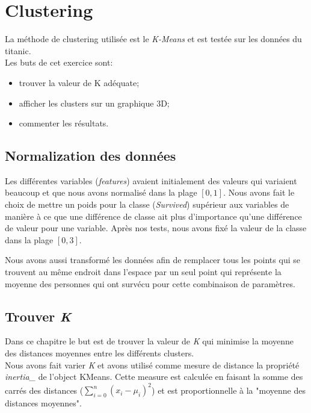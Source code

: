 \documentclass[11pt, a4paper]{article}
\begin{document}
\section{Clustering}

La méthode de clustering utilisée est le \textit{K-Means} et est testée sur les données du titanic. \\

Les buts de cet exercice sont:
\begin{itemize}
    \item trouver la valeur de K adéquate;
    \item afficher les clusters sur un graphique 3D;
    \item commenter les résultats. \\
\end{itemize}

\subsection{Normalization des données}

Les différentes variables (\textit{features}) avaient initialement des valeurs qui variaient
beaucoup et que nous avons normalisé dans la plage $[0, 1]$.
Nous avons fait le choix de mettre un poids pour la classe (\textit{Survived}) supérieur aux variables de manière à ce que
une différence de classe ait plus d'importance qu'une différence de valeur pour une variable.
Après nos tests, nous avons fixé la valeur de la classe dans la plage $[0, 3]$.

Nous avons aussi transformé les données afin de remplacer tous les points qui se trouvent au même endroit dans l'espace
par un seul point qui représente la moyenne des personnes qui ont survécu pour cette combinaison de paramètres.

\subsection{Trouver \textit{K}}

Dans ce chapitre le but est de trouver la valeur de \textit{K} qui minimise
la moyenne des distances moyennes entre les différents clusters. \\

Nous avons fait varier \textit{K} et avons utilisé comme mesure de distance la propriété \textit{inertia\_} de l'object KMeans.
Cette measure est calculée en faisant la somme des carrés des distances ($\sum_{i=0}^{n}(x_i - \mu_i)^2$)
et est proportionnelle à la "moyenne des distances moyennes". \\
\end{document}
